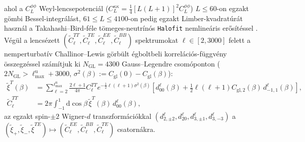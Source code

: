\documentclass[11pt,a4paper]{article}
\begin{document}
ahol a $C_L^{\phi\phi}$ Weyl-lencsepotenciál ($C_L^{\kappa\kappa} = \frac{1}{4}[L(L+1)]^2 C_L^{\phi\phi}$) $L \le 60$-on egzakt gömbi Bessel-integrálást, $61 \le L \le 4100$-on pedig egzakt Limber-kvadratúrát használ a Takahashi--Bird-féle tömeges-neutrínós \texttt{Halofit} nemlineáris erősítéssel \cite{Takahashi2012Halofit,Bird2012Halofit}. Végül a lencsézett $(\tilde{C}_\ell^{TT}, \tilde{C}_\ell^{TE}, \tilde{C}_\ell^{EE}, \tilde{C}_\ell^{BB})$ spektrumokat $\ell \in [2, 3000]$ felett a nemperturbatív Challinor--Lewis görbült égboltbeli korrelációs-függvény összegzéssel \cite{ChallinorLewis2005} számítjuk ki $N_{\mathrm{GL}} = 4300$ Gauss--Legendre csomóponton ($2N_{\mathrm{GL}} > \ell_{\max}^{\mathrm{u}} + 3000$, $\sigma^2(\beta) := C_{\mathrm{gl}}(0) - C_{\mathrm{gl}}(\beta)$):
\begin{equation}
\begin{aligned}
  \tilde{\xi}^T(\beta) &= \sum_{\ell=2}^{\ell_{\max}^{\mathrm{u}}}\frac{2\ell+1}{4\pi}C_\ell^{TT}e^{-\frac{1}{2}\ell(\ell+1)\sigma^2(\beta)}\!\left[d^\ell_{00}(\beta) + \frac{1}{2}\ell(\ell+1)C_{\mathrm{gl},2}(\beta)\,d^\ell_{-1,1}(\beta)\right], \\
  \tilde{C}_\ell^{TT} &= 2\pi\int_{-1}^1\!\mathrm{d}\cos\beta\,\tilde{\xi}^T(\beta)\,d^\ell_{00}(\beta),
\end{aligned}
\label{eq:challinor-lewis}
\end{equation}
az egzakt spin-$\pm 2$ Wigner-$d$ transzformációkkal $(d^\ell_{2,\pm 2},\allowbreak d^\ell_{20},\allowbreak d^\ell_{3,\pm 1},\allowbreak d^\ell_{3,-3})$ a $(\tilde{\xi}_+,\allowbreak \tilde{\xi}_-,\allowbreak \tilde{\xi}^{TE}) \mapsto\allowbreak (\tilde{C}_\ell^{EE},\allowbreak \tilde{C}_\ell^{BB},\allowbreak \tilde{C}_\ell^{TE})$ csatornákra.
\end{document}
